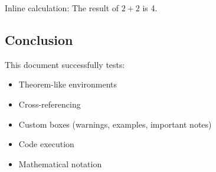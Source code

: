 \documentclass[
  14pt,
  a4paper,
]{extarticle}
\providecommand{\tightlist}{%
  \setlength{\itemsep}{0pt}\setlength{\parskip}{0pt}}
\begin{document}
Inline calculation: The result of \(2+2\) is 4.

\subsection{Conclusion}\label{conclusion}

This document successfully tests:

\begin{itemize}
\tightlist
\item
  Theorem-like environments
\item
  Cross-referencing
\item
  Custom boxes (warnings, examples, important notes)
\item
  Code execution
\item
  Mathematical notation
\end{itemize}
\end{document}
